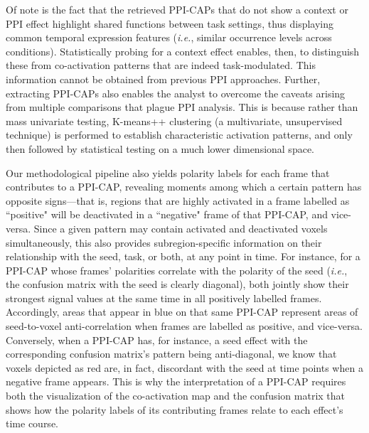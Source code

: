 Of note is the fact that the retrieved PPI-CAPs that do not show a context or PPI effect highlight shared functions between task settings, thus displaying common temporal expression features (\textit{i.e.}, similar occurrence levels across conditions). Statistically probing for a context effect enables, then, to distinguish these from co-activation patterns that are indeed task-modulated. This information cannot be obtained from previous PPI approaches. Further, extracting PPI-CAPs also enables the analyst to overcome the caveats arising from multiple comparisons that plague PPI analysis. This is because rather than mass univariate testing, K-means++ clustering (a multivariate, unsupervised technique) is performed to establish characteristic activation patterns, and only then followed by statistical testing on a much lower dimensional space.


Our methodological pipeline also yields polarity labels for each frame that contributes to a PPI-CAP, revealing moments among which a certain pattern has opposite signs---that is, regions that are highly activated in a frame labelled as ``positive" will be deactivated in a ``negative" frame of that PPI-CAP, and vice-versa. Since a given pattern may contain activated and deactivated voxels simultaneously, this also provides subregion-specific information on their relationship with the seed, task, or both, at any point in time. For instance, for a PPI-CAP whose frames' polarities correlate with the polarity of the seed (\textit{i.e.}, the confusion matrix with the seed is clearly diagonal), both jointly show their strongest signal values at the same time in all positively labelled frames. Accordingly, areas that appear in blue on that same PPI-CAP represent areas of seed-to-voxel anti-correlation when frames are labelled as positive, and vice-versa. Conversely, when a PPI-CAP has, for instance, a seed effect with the corresponding confusion matrix's pattern being anti-diagonal, we know that voxels depicted as red are, in fact, discordant with the seed at time points when a negative frame appears. This is why the interpretation of a PPI-CAP requires both the visualization of the co-activation map and the confusion matrix that shows how the polarity labels of its contributing frames relate to each effect's time course.  

